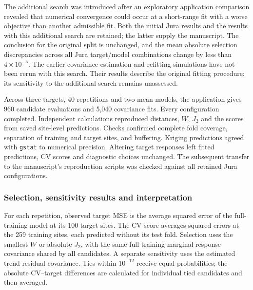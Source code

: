 \documentclass[11pt,a4paper]{article}
\begin{document}
The additional search was introduced after an exploratory application comparison revealed that numerical convergence could occur at a short-range fit with a worse objective than another admissible fit. Both the initial Jura results and the results with this additional search are retained; the latter supply the manuscript. The conclusion for the original split is unchanged, and the mean absolute selection discrepancies across all Jura target/model combinations change by less than $4\times10^{-5}$. The earlier covariance-estimation and refitting simulations have not been rerun with this search. Their results describe the original fitting procedure; its sensitivity to the additional search remains unassessed.

Across three targets, 40 repetitions and two mean models, the application gives 960 candidate evaluations and 5,040 covariance fits. Every configuration completed. Independent calculations reproduced distances, $W$, $J_2$ and the scores from saved site-level predictions. Checks confirmed complete fold coverage, separation of training and target sites, and buffering. Kriging predictions agreed with \texttt{gstat} to numerical precision. Altering target responses left fitted predictions, CV scores and diagnostic choices unchanged. The subsequent transfer to the manuscript's reproduction scripts was checked against all retained Jura configurations.

\subsubsection{Selection, sensitivity results and interpretation}
\label{sec:jura-sensitivity}
For each repetition, observed target MSE is the average squared error of the full-training model at its 100 target sites. The CV score averages squared errors at the 259 training sites, each predicted without its test fold. Selection uses the smallest $W$ or absolute $J_2$, with the same full-training marginal response covariance shared by all candidates. A separate sensitivity uses the estimated trend-residual covariance. Ties within $10^{-12}$ receive equal probabilities; the absolute CV--target differences are calculated for individual tied candidates and then averaged.

\begin{table}[htbp]
\centering\small
\caption{Jura: mean absolute difference between observed target MSE and the selected CV score across 40 repetitions. All values use squared natural-log cadmium units. ``Original split'' uses the dataset's original 100 validation sites. ``Random'' and ``kNNDM'' always use that scheme; $W$ and $|J_2|$ select among the four candidates. ``Best of four'' is the smallest observed absolute difference among those candidates within each repetition, using target responses only as an evaluation benchmark. Constant mean denotes ordinary kriging; the linear trend adds projected coordinates.}
\label{tab:jura-selection}

\end{table}
\end{document}
